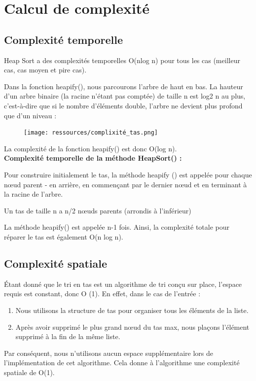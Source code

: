 \section{Calcul de complexité}
\subsection{Complexité temporelle}
Heap Sort a des complexités temporelles O(nlog n) pour tous les cas (meilleur cas, cas moyen et pire cas).
\par
Dans la fonction heapify(), nous parcourons l'arbre de haut en bas. La hauteur d'un arbre binaire (la racine n'étant pas comptée) de taille n est log2 n au plus, c'est-à-dire que si le nombre d'éléments double, l'arbre ne devient plus profond que d'un niveau :
 \\
 \begin{figure}[H]
    \centering
        \texttt{[image: ressources/complixité\_tas.png]}
        
    \label{fig:comtas}
\end{figure}

La complexité de la fonction heapify() est donc O(log n).
\\
\textbf{Complexité temporelle de la méthode HeapSort() :}

Pour construire initialement le tas, la méthode heapify () est appelée pour chaque nœud parent - en arrière, en commençant par le dernier nœud et en terminant à la racine de l'arbre.
\par
Un tas de taille n a n/2 nœuds parents (arrondis à l'inférieur) 
\par
La méthode heapify() est appelée n-1 fois. Ainsi, la complexité totale pour réparer le tas est également O(n log n).

\subsection{Complexité spatiale}
Étant donné que le tri en tas est un algorithme de tri conçu sur place, l'espace requis est constant, donc O (1). En effet, dans le cas de l'entrée :
\begin{enumerate}
  \item Nous utilisons la structure de tas pour organiser tous les éléments de la liste.
  \item Après avoir supprimé le plus grand nœud du tas max, nous plaçons l'élément supprimé à la fin de la même liste.
\end{enumerate}
Par conséquent, nous n'utilisons aucun espace supplémentaire lors de l'implémentation de cet algorithme. Cela donne à l'algorithme une complexité spatiale de O(1).
\\

